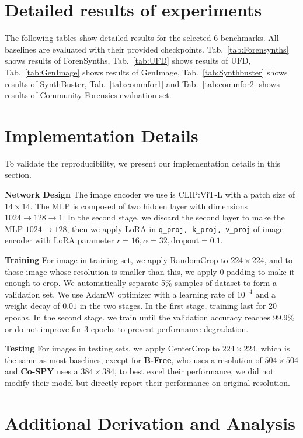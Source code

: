 \section{Detailed results of experiments}
The following tables show detailed results for the selected 6 benchmarks. All baselines are evaluated with their provided checkpoints. Tab.~\ref{tab:Forensynths} shows results of ForenSynths, Tab.~\ref{tab:UFD} shows results of UFD, Tab.~\ref{tab:GenImage} shows results of GenImage, Tab.~\ref{tab:Synthbuster} shows results of SynthBuster, Tab.~\ref{tab:commfor1}
and Tab.~\ref{tab:commfor2} shows results of Community Forensics evaluation set.

\label{sec:detailexp}
\section{Implementation Details}
\label{sec:impledet}
To validate the reproducibility, we present our implementation details in this section.

\textbf{Network Design} The image encoder we use is CLIP:ViT-L with a patch size of $14 \times 14$. The MLP is composed of two hidden layer with dimensions $1024 \xrightarrow{} 128 \xrightarrow{} 1$. In the second stage, we discard the second layer to make the MLP $1024 \xrightarrow{} 128$, then we apply LoRA \cite{hu2022lora} in \texttt{q\_proj, k\_proj, v\_proj} of image encoder with LoRA parameter $r=16, \alpha=32, \text{dropout}=0.1$.

\textbf{Training} For image in training set, we apply RandomCrop to $224 \times 224$, and to those image whose resolution is smaller than this, we apply 0-padding to make it enough to crop. We automatically separate 5\%  samples of dataset to form a validation set. We use AdamW \cite{loshchilov2017decoupled} optimizer with a learning rate of $10^{-4}$ and a weight decay of $0.01$ in the two stages. In the first stage, training last for 20 epochs. In the second stage. we train until the validation accuracy reaches 99.9\% or do not improve for 3 epochs to prevent performance degradation.

\textbf{Testing} For images in testing sets, we apply CenterCrop to $224 \times 224$, which is the same as most baselines, except for \textbf{B-Free}, who uses a resolution of $504 \times 504$ and \textbf{Co-SPY} uses a $384 \times 384$, to best excel their performance, we did not modify their model but directly report their performance on original resolution.

\section{Additional Derivation and Analysis}
\label{sec:additional_analysis}

